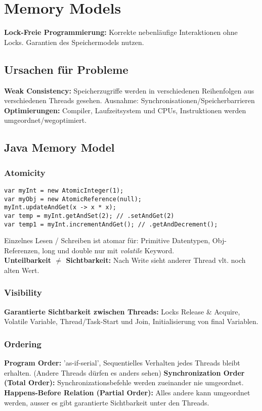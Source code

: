 \section{Memory Models}
\textbf{Lock-Freie Programmierung:} Korrekte nebenläufige Interaktionen ohne Locks.
Garantien des Speichermodels nutzen.
\subsection{Ursachen für Probleme}
\textbf{Weak Consistency:} Speicherzugriffe werden in verschiedenen Reihenfolgen aus verschiedenen Threads gesehen.
Ausnahme: Synchronisationen/Speicherbarrieren
\textbf{Optimierungen:} Compiler, Laufzeitsystem und CPUs, Instruktionen werden umgeordnet/wegoptimiert.

\subsection{Java Memory Model}
\subsubsection{Atomicity}
\begin{lstlisting}
var myInt = new AtomicInteger(1);
var myObj = new AtomicReference(null);
myInt.updateAndGet(x -> x * x);
var temp = myInt.getAndSet(2); // .setAndGet(2)
var temp1 = myInt.incrementAndGet(); // .getAndDecrement();
\end{lstlisting}
Einzelnes Lesen / Schreiben ist atomar für: Primitive Datentypen, Obj-Referenzen, long und double nur mit \textit{volatile} Keyword.\\ 
\textbf{Unteilbarkeit $\neq$ Sichtbarkeit:} Nach Write sieht anderer Thread vlt. noch alten Wert.

\subsubsection{Visibility}
\textbf{Garantierte Sichtbarkeit zwischen Threads:}
Locks Release \& Acquire, Volatile Variable, Thread/Task-Start und Join, Initialisierung von final Variablen.

\subsubsection{Ordering}
\textbf{Program Order:} 'as-if-serial', Sequentielles Verhalten jedes Threads bleibt erhalten. (Andere Threads dürfen es anders sehen)
\textbf{Synchronization Order (Total Order):} Synchronizationsbefehle werden zueinander nie umgeordnet.
\textbf{Happens-Before Relation (Partial Order):} Alles andere kann umgeordnet werden, ausser es gibt garantierte Sichtbarkeit unter den Threads.

